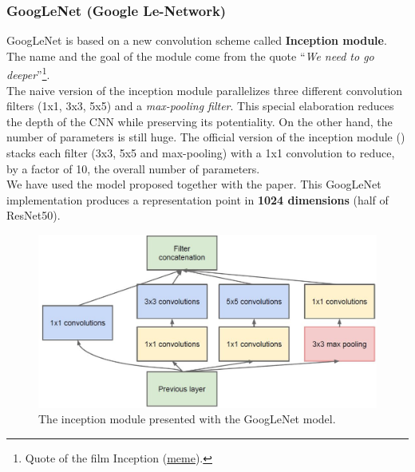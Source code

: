 \subsubsection*{GoogLeNet (Google Le-Network)}
GoogLeNet\cite{googLeNet_paper} is based on a new convolution scheme called \textbf{Inception module}. The name and the goal of the module come from the quote “\textit{We need to go deeper}”\footnote{Quote of the film Inception (\href{https://i.kym-cdn.com/photos/images/newsfeed/000/531/557/a88.jpg}{meme}).}.\\
The naive version of the inception module parallelizes three different convolution filters (1x1, 3x3, 5x5) and a \textit{max-pooling filter}. This special elaboration reduces the depth of the CNN while preserving its potentiality. On the other hand, the number of parameters is still huge. The official version of the inception module () stacks each filter (3x3, 5x5 and max-pooling) with a 1x1 convolution to reduce, by a factor of 10, the overall number of parameters.\\
We have used the model\cite{googleNet_model} proposed together with the paper. This GoogLeNet implementation produces a representation point in \textbf{1024 dimensions} (half of ResNet50).
\begin{figure}[!h]
	\centering
	\includegraphics[width=0.8\linewidth]{images/recognition/howItWorks_inceptionModule}
	\captionsetup{margin=0.5cm}
	\caption{The inception module presented with the GoogLeNet model.}
	\label{fig:howItWorks_inceptionModule}
\end{figure}

